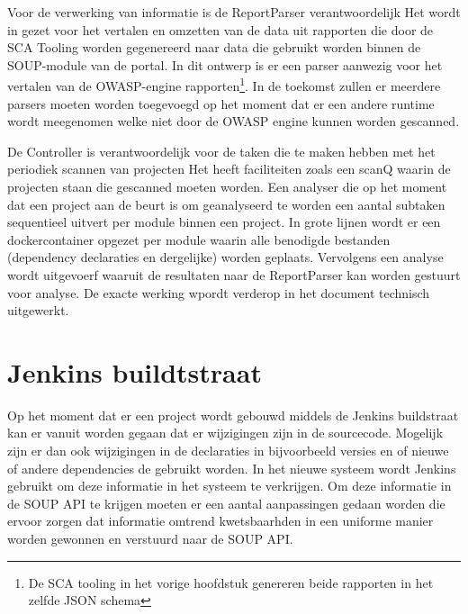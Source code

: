 Voor de verwerking van informatie is de ReportParser verantwoordelijk  Het wordt in gezet voor het vertalen en omzetten van de data uit rapporten die door de SCA Tooling worden gegenereerd naar data die gebruikt worden binnen de SOUP-module van de portal. In dit ontwerp is er een parser aanwezig voor het vertalen van de OWASP-engine rapporten\footnote{De SCA tooling in het vorige hoofdstuk genereren beide rapporten in het zelfde JSON schema}. In de toekomst zullen er meerdere parsers moeten worden toegevoegd op het moment dat er een andere runtime wordt meegenomen welke niet door de OWASP engine kunnen worden gescanned.

De Controller is verantwoordelijk voor de taken die te maken hebben met het periodiek scannen van projecten Het heeft faciliteiten zoals een scanQ waarin de projecten staan die gescanned moeten worden. Een analyser die op het moment dat een project aan de beurt is om geanalyseerd te worden een aantal subtaken sequentieel uitvert per module binnen een project.
In grote lijnen wordt er een dockercontainer opgezet per module waarin alle benodigde bestanden (dependency declaraties en dergelijke) worden geplaats. Vervolgens een analyse wordt uitgevoerf waaruit de resultaten naar de ReportParser kan worden gestuurt voor analyse. De exacte werking wpordt verderop in het document technisch uitgewerkt.

\section{Jenkins buildtstraat}\label{sec:jenkins-buildtstraat}
Op het moment dat er een project wordt gebouwd middels de Jenkins buildstraat kan er vanuit worden gegaan dat er wijzigingen zijn in de sourcecode. Mogelijk zijn er dan ook wijzigingen in de declaraties in bijvoorbeeld versies en of nieuwe of andere dependencies de gebruikt worden. In het nieuwe systeem wordt Jenkins gebruikt om deze informatie in het systeem te verkrijgen. Om deze informatie in de SOUP API te krijgen moeten er een aantal aanpassingen gedaan worden die ervoor zorgen dat informatie omtrend kwetsbaarhden in een uniforme manier worden gewonnen en verstuurd naar de SOUP API.


